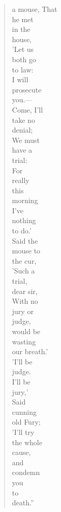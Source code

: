\begin{quote}
    a mouse, That\\
                  he met\\
                     in the\\
                       house,\\
                    'Let us\\
                both go\\
              to law:\\
           I will\\
   prosecute\\
you.—\\
    Come, I'll\\
         take no\\
             denial;\\
                   We must\\
                         have a\\
        trial:\\
             For\\
        really\\
    this\\
                               morning\\
               I've\\
     nothing\\
 to do.'\\
                         Said the\\
     mouse to\\
    the cur,\\
      'Such a\\
                 trial,\\
       dear sir,\\
With no\\
             jury or\\
judge,\\
   would be\\
      wasting\\
        our breath.'\\
                           'I'll be\\
       judge.\\
     I'll be\\
  jury,'\\
Said\\
    cunning\\
            old Fury;\\
     'I'll try\\
                   the whole\\
       cause,\\
          and\\
     condemn\\
   you\\
 to\\
    death.''\\
\end{quote}

